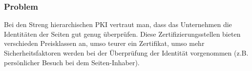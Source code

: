 \subsubsection{Problem}

Bei den Streng hierarchischen PKI vertraut man, dass das Unternehmen die Identitäten der Seiten gut genug überprüfen. Diese Zertifizierungsstellen bieten verschieden Preisklassen an, umso teurer ein Zertifikat, umso mehr Sicherheitsfaktoren werden bei der Überprüfung der Identität vorgenommen (z.B. persönlicher Besuch bei dem Seiten-Inhaber).


